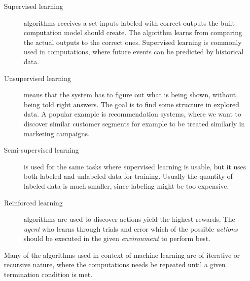 \begin{description}
\item[Supervised learning] algorithms receives a set inputs labeled with correct outputs the built computation model should create. The  algorithm learns from comparing the actual outputs to the correct ones. Supervised learning is commonly used in computations, where future events can be predicted by historical data. 
\item[Unsupervised learning] means that the system has to figure out what is being shown, without being told right answers. The goal is to find some structure in explored data. A popular example is recommendation systems, where we want to discover similar customer segments for example to be treated similarly in marketing campaigns.
\item[Semi-supervised learning] is used for the same tasks where supervised learning is usable, but it uses both labeled and unlabeled data for training. Usually the quantity of labeled data is much smaller, since labeling might be too expensive. 
\item[Reinforced learning] algorithms are used to discover actions yield the highest rewards. The {\textit{agent}} who learns through trials and error which of the possible {\textit{actions}} should be executed in the given {\textit{environment}} to perform best.
\end{description}

Many of the algorithms used in context of machine learning are of iterative or recursive nature, where the computations needs be repeated until a given termination condition is met.\cite{allroadsleadtorome}



